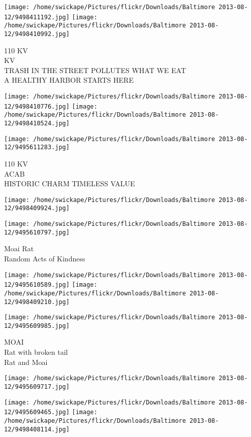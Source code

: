 \documentclass[10pt,letterpaper]{article}
\begin{document}
\texttt{[image: /home/swickape/Pictures/flickr/Downloads/Baltimore 2013-08-12/9498411192.jpg]}
\texttt{[image: /home/swickape/Pictures/flickr/Downloads/Baltimore 2013-08-12/9498410992.jpg]}

110 KV\\
KV\\
TRASH IN THE STREET POLLUTES WHAT WE EAT\\
A HEALTHY HARBOR STARTS HERE
\pagebreak

\texttt{[image: /home/swickape/Pictures/flickr/Downloads/Baltimore 2013-08-12/9498410776.jpg]}
\texttt{[image: /home/swickape/Pictures/flickr/Downloads/Baltimore 2013-08-12/9498410524.jpg]}

\vspace{0.25in}
\texttt{[image: /home/swickape/Pictures/flickr/Downloads/Baltimore 2013-08-12/9495611283.jpg]}

110 KV\\
ACAB\\
HISTORIC CHARM TIMELESS VALUE
\pagebreak

\texttt{[image: /home/swickape/Pictures/flickr/Downloads/Baltimore 2013-08-12/9498409924.jpg]}

\vspace{0.25in}
\texttt{[image: /home/swickape/Pictures/flickr/Downloads/Baltimore 2013-08-12/9495610797.jpg]}

Moai Rat\\
Random Acts of Kindness
\pagebreak

\texttt{[image: /home/swickape/Pictures/flickr/Downloads/Baltimore 2013-08-12/9495610589.jpg]}
\texttt{[image: /home/swickape/Pictures/flickr/Downloads/Baltimore 2013-08-12/9498409210.jpg]}

\texttt{[image: /home/swickape/Pictures/flickr/Downloads/Baltimore 2013-08-12/9495609985.jpg]}

MOAI\\
Rat with broken tail\\
Rat and Moai
\pagebreak

\texttt{[image: /home/swickape/Pictures/flickr/Downloads/Baltimore 2013-08-12/9495609717.jpg]}

\vspace{0.25in}
\texttt{[image: /home/swickape/Pictures/flickr/Downloads/Baltimore 2013-08-12/9495609465.jpg]}
\texttt{[image: /home/swickape/Pictures/flickr/Downloads/Baltimore 2013-08-12/9498408114.jpg]}
\end{document}
